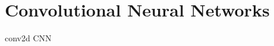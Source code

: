 \section{Convolutional Neural Networks}
\label{convolutional_neural_networks}

\gls{conv2d}
\gls{CNN}
